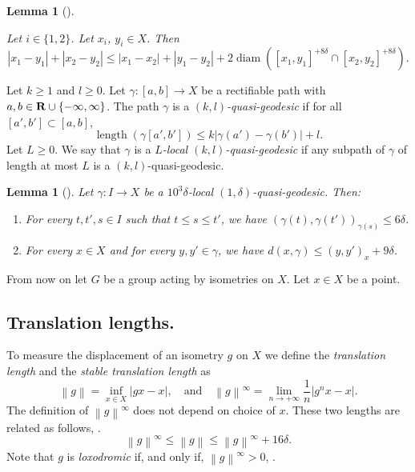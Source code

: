 \documentclass[leqno,a4paper,10pt]{amsart}
\theoremstyle{plain}
\newtheorem{lem}[thm]{Lemma}
\theoremstyle{definition}
\theoremstyle{remark}
\DeclareMathOperator{\diam}{diam}
\DeclareMathOperator{\length}{length}
\renewcommand{\leq}{\leqslant}
\newcommand{\R}{\mathbf{R}}
\let\le\leqslant
\let\ge\geqslant
\let\leq\leqslant
\newcommand{\stlen}[1]{
	\left\| #1\right\|^{\infty}
}
\newcommand{\tlen}[1]{
	\left\| #1\right\|
}
\begin{document}
\begin{lem}[]
	
	\label{lem:intersection-four-points}
	
	Let $i\in \{1,2\}$. Let $x_i$, $y_i\in X$. Then
	$$|x_1-y_1|+|x_2-y_2|\le |x_1-x_2|+|y_1-y_2|+2\diam([x_1,y_1]^{+8\delta}\cap[x_2,y_2]^{+8\delta}).$$
	
\end{lem}

Let $k \ge 1$ and $l \ge 0$. Let $\gamma:[a,b]\to X$ be a rectifiable path with $a,b\in \R\cup\qty{-\infty,\infty}$. The path $\gamma$ is a \emph{$(k,l)$-quasi-geodesic} if for all $[a',b']\subset [a,b]$,
$$\length(\gamma[a',b'])\le k |\gamma(a')-\gamma(b')|+l.$$ 
Let $L\ge 0$. We say that $\gamma$ is a \emph{$L$-local $(k,l)$-quasi-geodesic} if any subpath of $\gamma$ of length at most $L$ is a $(k,l)$-quasi-geodesic. 

\begin{lem}[]
\label{lem:quasi-line}
Let $\gamma\colon I\to X$ be a $10^3\delta$-local $(1,\delta)$-quasi-geodesic. Then:
\begin{enumerate}[label=(\roman*)]
	\item For every $t,t',s\in I$ such that $t\le s\le t'$, we have $(\gamma(t),\gamma(t'))_{\gamma(s)}\le 6\delta$.
	\item For every $x\in X$ and for every $y,y'\in \gamma$, we have $d(x,\gamma)\le (y,y')_x+9\delta$.
\end{enumerate}
\end{lem}

From now on let $G$ be a group acting by isometries on $X$. Let $x \in X$ be a point.
  
\subsection{Translation lengths.} 

To measure the displacement of an isometry $g$ on $X$ we define the \emph{translation length} and the  \emph{stable translation length} as
$$
	\tlen g = \inf_{x \in X} |gx-x|, 
	\quad \text{and} \quad
	\stlen g = \lim_{n \rightarrow + \infty} \frac 1n |g^nx-x|.
$$
The definition of $\stlen{g}$ does not depend on choice of $x$. These two lengths are related as follows, \cite[Chapitre~10, Proposition~6.4]{coornaert_geometrie_1990}.
\begin{equation}	
	\label{eqn:translation lengths}
	\stlen g \leq \tlen g \leq \stlen g + 16\delta.
\end{equation}
Note that $g$ is \emph{loxodromic} if, and only if, $\stlen g >0$, \cite[Ch.~10, Prop.~6.3]{coornaert_geometrie_1990}.
\end{document}
